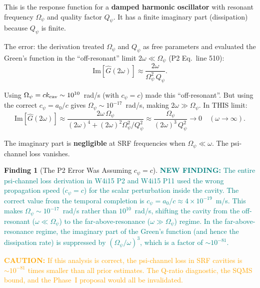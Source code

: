 \documentclass[11pt]{article}
\newcommand{\Qpsi}{Q_\psi}
\newcommand{\ee}[1]{\times 10^{#1}}
\newcommand{\Opsi}{\Omega_\psi}
\newcommand{\caution}[1]{\textcolor{orange}{\textbf{CAUTION:} #1}}
\newcommand{\newfinding}[1]{\textcolor{teal}{\textbf{NEW FINDING:} #1}}
\theoremstyle{definition}
\newtheorem{finding}[theorem]{Finding}
\theoremstyle{remark}
\begin{document}
This is the response function for a \textbf{damped harmonic oscillator}
with resonant frequency $\Opsi$ and quality factor $\Qpsi$. It has a
finite imaginary part (dissipation) because $\Qpsi$ is finite.

The error: the derivation treated $\Opsi$ and $\Qpsi$ as free
parameters and evaluated the Green's function in the
``off-resonant'' limit $2\omega \ll \Opsi$ (P2 Eq.~line 510):
\begin{equation}
\text{Im}[\hat{G}(2\omega)] \approx \frac{2\omega}{\Opsi^2\,\Qpsi}.
\end{equation}

Using $\Opsi = c k_{\rm cav} \sim 10^{10}$~rad/s (with $c_\psi = c$)
made this ``off-resonant''. But using the correct $c_\psi = a_0/c$
gives $\Opsi \sim 10^{-17}$~rad/s, making $2\omega \gg \Opsi$. In
THIS limit:
\begin{equation}
\text{Im}[\hat{G}(2\omega)] \approx
\frac{2\omega\,\Opsi}{(2\omega)^4 + (2\omega)^2\Opsi^2/\Qpsi^2}
\approx \frac{\Opsi}{(2\omega)^3\,\Qpsi^2}
\to 0 \quad (\omega \to \infty).
\end{equation}

The imaginary part is \textbf{negligible} at SRF frequencies when
$\Opsi \ll \omega$. The psi-channel loss vanishes.

\begin{finding}[The P2 Error Was Assuming $c_\psi = c$]
\label{find:error}
\newfinding{The entire psi-channel loss derivation in W4i15 P2 and
W4i15 P11 used the wrong propagation speed ($c_\psi = c$) for the
scalar perturbation inside the cavity. The correct value from the
temporal completion is $c_\psi = a_0/c \approx 4\ee{-19}$~m/s.
This makes $\Opsi \sim 10^{-17}$~rad/s rather than $10^{10}$~rad/s,
shifting the cavity from the off-resonant ($\omega \ll \Opsi$) to
the far-above-resonance ($\omega \gg \Opsi$) regime. In the
far-above-resonance regime, the imaginary part of the Green's
function (and hence the dissipation rate) is suppressed by
$(\Opsi/\omega)^3$, which is a factor of $\sim 10^{-81}$.}

\caution{If this analysis is correct, the psi-channel loss in SRF
cavities is $\sim 10^{-81}$ times smaller than all prior estimates.
The Q-ratio diagnostic, the SQMS bound, and the Phase~I proposal
would all be invalidated.}
\end{finding}


\end{document}
